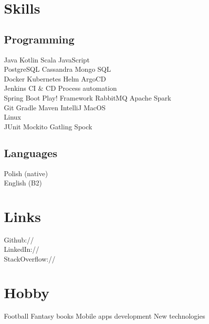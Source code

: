 
\section{Skills}
\subsection{Programming}
Java \textbullet{}
Kotlin \textbullet{}
Scala \textbullet{}
JavaScript \\
PostgreSQL \textbullet{}   
Cassandra \textbullet{} 
Mongo \textbullet{} 
SQL \\
Docker \textbullet{} 
Kubernetes \textbullet{}
Helm \textbullet{}  
ArgoCD \\ 
Jenkins \textbullet{} 
CI \& CD Process automation\\
Spring Boot \textbullet{} 
Play! Framework \textbullet{} 
RabbitMQ \textbullet{} 
Apache Spark \\
Git \textbullet{} 
Gradle \textbullet{} 
Maven \textbullet{}
IntelliJ \textbullet{}
MacOS \\
Linux \\
JUnit \textbullet{} 
Mockito \textbullet{} 
Gatling \textbullet{} 
Spock \\
\sectionsep
\subsection{Languages}
Polish (native) \\
English (B2)
\sectionsep


\section{Links} 
Github:// \href{https://github.com/emlagowski}{} \\
LinkedIn://  \href{https://www.linkedin.com/in/marcinlagowski}{} \\
StackOverflow://  \href{http://stackoverflow.com/users/3233685/marcin-lagowski}{} 
\sectionsep


\section{Hobby}
Football \textbullet{}   
Fantasy books \textbullet{} 
Mobile apps development \textbullet{} 
New technologies \\

%
%
